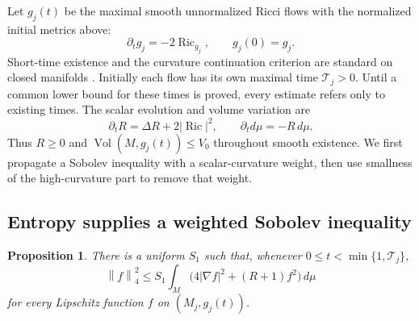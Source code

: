 \documentclass[11pt]{article}
\newtheorem{proposition}[theorem]{Proposition}
\theoremstyle{definition}
\theoremstyle{remark}
\numberwithin{equation}{section}
\DeclareMathOperator{\Ric}{Ric}
\DeclareMathOperator{\Vol}{Vol}
\newcommand{\dd}{\,d\mu}
\newcommand{\norm}[1]{\left\lVert #1\right\rVert}
\begin{document}
Let $g_j(t)$ be the maximal smooth unnormalized Ricci flows with the
normalized initial metrics above:
\[
 \partial_tg_j=-2\Ric_{g_j},\qquad g_j(0)=g_j.
\]
Short-time existence and the curvature continuation criterion are
standard on closed manifolds \cite{HamiltonRF}. Initially each flow
has its own maximal time $\mathcal T_j>0$. Until a common lower bound
for these times is proved, every estimate refers only to existing
times. The scalar evolution and volume variation are
\begin{equation}\label{eq:scalar-volume}
 \partial_tR=\Delta R+2|\Ric|^2,\qquad
 \partial_td\mu=-R\,d\mu.
\end{equation}
Thus $R\ge0$ and $\Vol(M,g_j(t))\le V_0$ throughout smooth existence.
We first propagate a Sobolev inequality with a scalar-curvature weight,
then use smallness of the high-curvature part to remove that weight.

\subsection{Entropy supplies a weighted Sobolev inequality}

\begin{proposition}\label{prop:weighted}
There is a uniform $S_1$ such that, whenever
$0\le t<\min\{1,\mathcal T_j\}$,
\begin{equation}\label{eq:weighted}
 \norm f_4^2\le S_1\int_M\bigl(4|\nabla f|^2+(R+1)f^2\bigr)\dd
\end{equation}
for every Lipschitz function $f$ on $(M_j,g_j(t))$.
\end{proposition}
\end{document}
